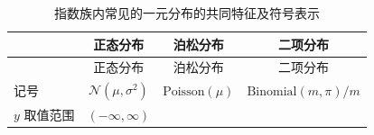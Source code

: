 \documentclass[12pt,a4paper,UTF8,twoside]{book}
\theoremstyle{definition}
\theoremstyle{definition}
\theoremstyle{definition}
\theoremstyle{remark}
\begin{document}
\begin{longtable}[]{@{}lccc@{}}
\caption[\label{tab:common-characteristics}
指数族内常见的一元分布的共同特征及符号表示]{\label{tab:common-characteristics}
指数族内常见的一元分布的共同特征及符号表示\footnotemark{}}\tabularnewline
\toprule
\begin{minipage}[b]{0.21\columnwidth}\raggedright
\strut
\end{minipage} & \begin{minipage}[b]{0.22\columnwidth}\centering
正态分布\strut
\end{minipage} & \begin{minipage}[b]{0.22\columnwidth}\centering
泊松分布\strut
\end{minipage} & \begin{minipage}[b]{0.22\columnwidth}\centering
二项分布\strut
\end{minipage}\tabularnewline
\midrule
\endfirsthead
\toprule
\begin{minipage}[b]{0.21\columnwidth}\raggedright
\strut
\end{minipage} & \begin{minipage}[b]{0.22\columnwidth}\centering
正态分布\strut
\end{minipage} & \begin{minipage}[b]{0.22\columnwidth}\centering
泊松分布\strut
\end{minipage} & \begin{minipage}[b]{0.22\columnwidth}\centering
二项分布\strut
\end{minipage}\tabularnewline
\midrule
\endhead
\begin{minipage}[t]{0.21\columnwidth}\raggedright
记号\strut
\end{minipage} & \begin{minipage}[t]{0.22\columnwidth}\centering
\(\mathcal{N}(\mu,\sigma^2)\)\strut
\end{minipage} & \begin{minipage}[t]{0.22\columnwidth}\centering
\(\mathrm{Poisson}(\mu)\)\strut
\end{minipage} & \begin{minipage}[t]{0.22\columnwidth}\centering
\(\mathrm{Binomial}(m,\pi)/m\)\strut
\end{minipage}\tabularnewline
\begin{minipage}[t]{0.21\columnwidth}\raggedright
\(y\) 取值范围\strut
\end{minipage} & \begin{minipage}[t]{0.22\columnwidth}\centering
\((-\infty,\infty)\)\strut

\end{minipage}
\end{longtable}
\end{document}
